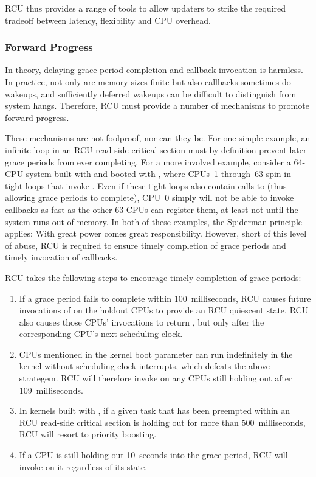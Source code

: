 RCU thus provides a range of tools to allow updaters to strike the
required tradeoff between latency, flexibility and CPU overhead.


\subsubsection{Forward Progress}

In theory, delaying grace-period completion and callback invocation is
harmless.
In practice, not only are memory sizes finite but also
callbacks sometimes do wakeups, and sufficiently deferred wakeups can be
difficult to distinguish from system hangs.
Therefore, RCU must provide
a number of mechanisms to promote forward progress.

These mechanisms are not foolproof, nor can they be. For one simple
example, an infinite loop in an RCU read-side critical section must by
definition prevent later grace periods from ever completing.
For a more
involved example, consider a 64-CPU system built with
 and booted with , where
CPUs~1 through~63 spin in tight loops that invoke .
Even
if these tight loops also contain calls to  (thus
allowing grace periods to complete), CPU~0 simply will not be able to
invoke callbacks as fast as the other 63 CPUs can register them, at
least not until the system runs out of memory.
In both of these
examples, the Spiderman principle applies:
With great power comes great
responsibility.
However, short of this level of abuse, RCU is required
to ensure timely completion of grace periods and timely invocation of
callbacks.

RCU takes the following steps to encourage timely completion of grace
periods:

\begin{enumerate}
\item If a grace period fails to complete within 100 milliseconds, RCU
   causes future invocations of  on the holdout CPUs
   to provide an RCU quiescent state.
   RCU also causes those CPUs'
    invocations to return , but only after the
   corresponding CPU's next scheduling-clock.
\item CPUs mentioned in the  kernel boot parameter can run
   indefinitely in the kernel without scheduling-clock interrupts, which
   defeats the above  strategem.
   RCU will therefore
   invoke  on any  CPUs still holding out
   after 109 milliseconds.
\item In kernels built with , if a given task that
   has been preempted within an RCU read-side critical section is
   holding out for more than 500 milliseconds, RCU will resort to
   priority boosting.
\item If a CPU is still holding out 10 seconds into the grace period, RCU
   will invoke  on it regardless of its 
   state.
\end{enumerate}

